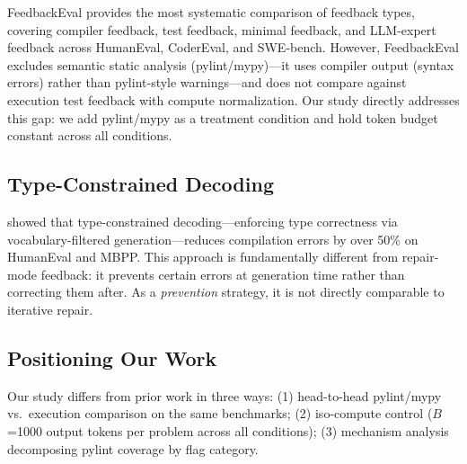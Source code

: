 FeedbackEval \cite{Dai2025FeedbackEval} provides the most systematic comparison of feedback types, covering compiler feedback, test feedback, minimal feedback, and LLM-expert feedback across HumanEval, CoderEval, and SWE-bench. However, FeedbackEval excludes semantic static analysis (pylint/mypy)---it uses compiler output (syntax errors) rather than pylint-style warnings---and does not compare against execution test feedback with compute normalization. Our study directly addresses this gap: we add pylint/mypy as a treatment condition and hold token budget constant across all conditions.

\subsection{Type-Constrained Decoding}

\citet{Mundler2025Type} showed that type-constrained decoding---enforcing type correctness via vocabulary-filtered generation---reduces compilation errors by over 50\% on HumanEval and MBPP. This approach is fundamentally different from repair-mode feedback: it prevents certain errors at generation time rather than correcting them after. As a \emph{prevention} strategy, it is not directly comparable to iterative repair.

\subsection{Positioning Our Work}

Our study differs from prior work in three ways: (1) head-to-head pylint/mypy vs.\ execution comparison on the same benchmarks; (2) iso-compute control ($B$=1000 output tokens per problem across all conditions); (3) mechanism analysis decomposing pylint coverage by flag category.
